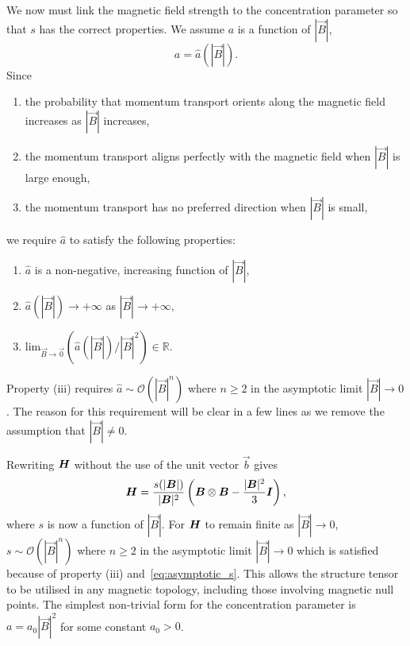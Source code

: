 We now must link the magnetic field strength to the concentration parameter so that $s$ has the correct properties. We assume $a$ is a function of $|\vec{B}|$,
\begin{equation}
  a = \hat{a}(|\vec{B}|).
\end{equation}
Since
\begin{enumerate}[label={(\arabic*)}]
  \item the probability that momentum transport orients along the magnetic field increases as $|\vec{B}|$ increases,
  \item the momentum transport aligns perfectly with the magnetic field when $|\vec{B}|$ is large enough,
  \item the momentum transport has no preferred direction when $|\vec{B}|$ is small,
\end{enumerate}
we require $\hat{a}$ to satisfy the following properties:
\begin{enumerate}[label={(\roman*)}]
  \item $\hat{a}$ is a non-negative, increasing function of $|\vec{B}|$,
  \item $\hat{a}(|\vec{B}|) \to + \infty$ as $|\vec{B}| \to + \infty$,
  \item lim$_{\vec{B} \to \vec{0}}(\hat{a}(|\vec{B}|)/ |\vec{B}|^2) \in \mathbb{R}$.
\end{enumerate}
Property (iii) requires $\hat{a} \sim \mathcal{O}(|\vec{B}|^n)$ where $n \geq 2$ in the asymptotic limit $|\vec{B}| \to 0$. The reason for this requirement will be clear in a few lines as we remove the assumption that $|\vec{B}| \neq 0$.

Rewriting ${\bm H}$ without the use of the unit vector $\vec{b}$ gives
\begin{equation}
  \label{eq:structure_tensor2}
  {\bm H} = \frac{s(|{\bm B}|)}{|{\bm B}|^2}\left( {\bm B} \otimes {\bm B} - \frac{|{\bm B}|^2}{3}{\bm I} \right),
\end{equation}
where $s$ is now a function of $|\vec{B}|$. For ${\bm H}$ to remain finite as $|\vec{B}| \to 0$, $s \sim \mathcal{O}(|\vec{B}|^n)$ where $n \geq 2$ in the asymptotic limit $|\vec{B}| \to 0$ which is satisfied because of property (iii) and~\ref{eq:asymptotic_s}. This allows the structure tensor to be utilised in any magnetic topology, including those involving magnetic null points. The simplest non-trivial form for the concentration parameter is $a = a_0 |\vec{B}|^2$ for some constant $a_0 > 0$.

